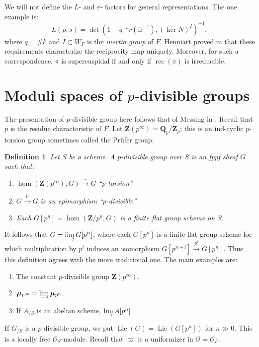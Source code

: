 \documentclass{article}
\DeclareMathOperator{\lie}{Lie}
\DeclareMathOperator{\reciprocity}{rec}
\newcommand{\frob}{\mathrm{fr}} %
\newcommand{\iso}{\xrightarrow\sim}
\newcommand{\cO}{\mathcal{O}}
\newcommand{\dmu}{\bm\mu}
\newcommand{\dQ}{\mathbf{Q}}
\newcommand{\dZ}{\mathbf{Z}}
\newcommand{\sO}{\mathscr{O}}
\newtheorem{definition}[subsection]{Definition}
\begin{document}
We will not define the $L$- and $\varepsilon$- factors for general 
representations. The one example is: 
\[
  L(\rho,s) = \det\left(1-q^{-s} r(\frob^{-1}), (\ker N)^I\right)^{-1} ,
\]
where $q=\# k$ and $I\subset W_F$ is the \emph{inertia group} of $F$.  
Henniart proved in \cite{henniart-1993} that these requirements characterize 
the reciprocity map uniquely. Moreover, for such a correspondence, $\pi$ is 
supercuspidal if and only if $\reciprocity(\pi)$ is irreducible. 





\section{Moduli spaces of \texorpdfstring{$p$}{p}-divisible groups}

The presentation of $p$-divisible group here follows that of 
Messing in \cite{messing-1972}. Recall that $p$ is the residue characteristic 
of $F$. Let $\dZ(p^\infty)=\dQ_p/\dZ_p$; this is an ind-cyclic $p$-torsion 
group sometimes called the Pr\"ufer group. 

\begin{definition}
Let $S$ be a scheme. A \emph{$p$-divisible group} over $S$ is an fppf 
sheaf $G$ such that: 
\begin{enumerate}
  \item $\hom(\dZ(p^\infty),G)\iso G$ ``$p$-torsion''
  \item $G\xrightarrow p G$ is an epimorphism ``$p$-divisible''
  \item Each $G[p^n]=\hom(\dZ/p^n,G)$ is a finite flat group scheme on $S$. 
\end{enumerate}
\end{definition}

It follows that $G=\varinjlim G[p^n]$, where each $G[p^n]$ is a finite flat 
group scheme for which multiplication by $p^i$ induces an isomorphism 
$G[p^{n+i}]\xrightarrow{p^i}G[p^n]$. Thus this definition agrees with the more 
traditional one. The main examples are: 
\begin{enumerate}
  \item The constant $p$-divisible group $\dZ(p^\infty)$. 
  \item $\dmu_{p^\infty} = \varinjlim \dmu_{p^n}$. 
  \item If $A_{/S}$ is an abelian scheme, $\varinjlim A[p^n]$. 
\end{enumerate}

If $G_{/S}$ is a $p$-divisible group, we put $\lie(G)=\lie(G[p^n])$ for 
$n\gg 0$. This is a locally free $\sO_S$-module. Recall that $\varpi$ is a 
uniformizer in $\cO=\cO_F$. 
\end{document}
